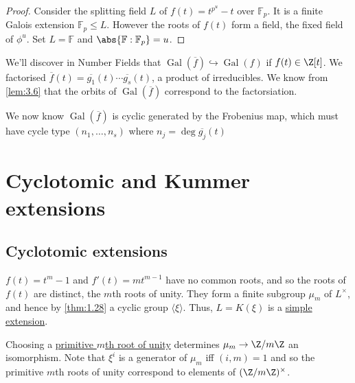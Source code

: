 \documentclass{article}
\DeclareMathOperator{\chara}{char}
\DeclareMathOperator{\Gal}{Gal}
\newcommand{\F}{\mathbb{F}}
\begin{document}
\begin{proof}
    Consider the splitting field $L$ of $f(t) = t^{p^u} - t$ over $\F_p$.
    It is a finite Galois extension $\F_p \leq L$.
    However the roots of $f(t)$ form a field, the fixed field of $\phi^u$.
    Set $L = \F$ and $\abs{\F :\F_p} = u$.
\end{proof}

\begin{remark}
    We'll discover in Number Fields that $\Gal(\overline{f}) \hookrightarrow \Gal(f)$ if $f(t) \in \Z[t]$.
    We factorised $\overline{f}(t) = \overline{g_1}(t) \dotsm \overline{g_s}(t)$, a product of irreducibles.
    We know from \cref{lem:3.6} that the orbits of $\Gal(\overline{f})$ correspond to the factorsiation.

    We now know $\Gal(\overline{f})$ is cyclic generated by the Frobenius map, which must have cycle type $(n_1, \dotsc, n_s)$ where $n_j = \deg \overline{g_j}(t)$
\end{remark}

\clearpage
\section{Cyclotomic and Kummer extensions}
\subsection{Cyclotomic extensions}

\begin{remark}
    $f(t) = t^m - 1$ and $f'(t) = m t^{m-1}$ have no common roots, and so the roots of $f(t)$ are distinct, the $m$th roots of unity.
    They form a finite subgroup $\mu_m$ of $L^\times$, and hence by \cref{thm:1.28} a cyclic group $\langle \xi \rangle$.
    Thus, $L = K(\xi)$ is a \hyperlink{def:genField}{simple extension}.
\end{remark}

Choosing a \hyperlink{def:primRoot}{primitive $m$th root of unity} determines $\mu_m \to \Z /m\Z$ an isomorphism.
Note that $\xi^i$ is a generator of $\mu_m$ iff $(i, m) = 1$ and so the primitive $m$th roots of unity correspond to elements of $(\Z/m\Z)^\times$.
\end{document}
